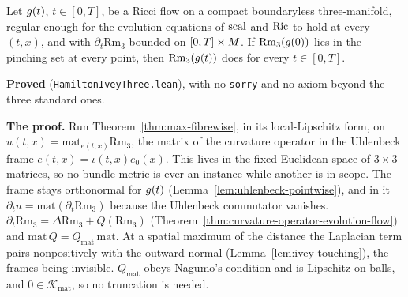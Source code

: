 \begin{theorem}
  \label{thm:hamilton-ivey-preserved}
  \leanok
  Let $g(t)$, $t\in[0,T]$, be a Ricci flow on a compact boundaryless three-manifold, regular
  enough for the evolution equations of $\operatorname{scal}$ and $\operatorname{Ric}$ to hold at every $(t,x)$, and with
  $\partial_t\mathrm{Rm}_3$ bounded on $[0,T]\times M$. If $\mathrm{Rm}_3(g(0))$ lies in
  the pinching set at every point, then $\mathrm{Rm}_3(g(t))$ does for every $t\in[0,T]$.

  \textbf{Proved} (\texttt{HamiltonIveyThree.lean}), with no \texttt{sorry} and no axiom beyond
  the three standard ones.

  \textbf{The proof.} Run Theorem~\ref{thm:max-fibrewise}, in its local-Lipschitz form, on
  $u(t,x) = \mathrm{mat}_{e(t,x)}\mathrm{Rm}_3$, the matrix of the curvature operator in the
  Uhlenbeck frame $e(t,x) = \iota(t,x)e_0(x)$. This lives in the fixed Euclidean space of
  $3\times 3$ matrices, so no bundle metric is ever an instance while another is in scope. The
  frame stays orthonormal for $g(t)$ (Lemma~\ref{lem:uhlenbeck-pointwise}), and in it
  $\partial_t u = \mathrm{mat}(\partial_t\mathrm{Rm}_3)$ because the Uhlenbeck commutator vanishes.
  $\partial_t\mathrm{Rm}_3 = \Delta\mathrm{Rm}_3 + Q(\mathrm{Rm}_3)$
  (Theorem~\ref{thm:curvature-operator-evolution-flow}) and $\mathrm{mat}\,Q = Q_{\mathrm{mat}}\,
  \mathrm{mat}$. At a spatial maximum of the distance the Laplacian term pairs nonpositively with
  the outward normal (Lemma~\ref{lem:ivey-touching}), the frames being invisible. $Q_{\mathrm{mat}}$
  obeys Nagumo's condition and is Lipschitz on balls, and $0 \in \mathcal{K}_{\mathrm{mat}}$, so
  no truncation is needed.


\end{theorem}
